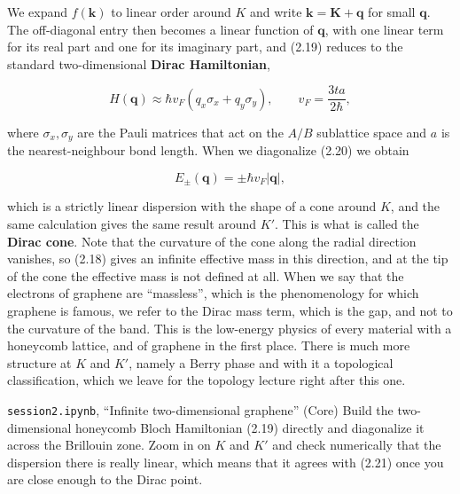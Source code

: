 We expand $f(\mathbf{k})$ to linear order around $K$ and write $\mathbf{k}=\mathbf{K}+\mathbf{q}$ for
small $\mathbf{q}$. The off-diagonal entry then becomes a linear function of $\mathbf{q}$, with one
linear term for its real part and one for its imaginary part, and (2.19) reduces to the standard
two-dimensional \textbf{Dirac Hamiltonian},

\begin{equation}H(\mathbf{q}) \approx \hbar v_F\left(q_x\sigma_x + q_y\sigma_y\right), \qquad
v_F = \frac{3ta}{2\hbar},\end{equation}

where $\sigma_x,\sigma_y$ are the Pauli matrices that act on the $A/B$ sublattice space and $a$ is
the nearest-neighbour bond length. When we diagonalize (2.20) we obtain

\begin{equation}E_\pm(\mathbf{q}) = \pm \hbar v_F |\mathbf{q}|,\end{equation}

which is a strictly linear dispersion with the shape of a cone around $K$, and the same calculation
gives the same result around $K'$. This is what is called the \textbf{Dirac cone}. Note that the
curvature of the cone along the radial direction vanishes, so (2.18) gives an infinite effective
mass in this direction, and at the tip of the cone the effective mass is not defined at all. When
we say that the electrons of graphene are ``massless'', which is the phenomenology for which graphene
is famous, we refer to the Dirac mass term, which is the gap, and not to the curvature of the band. This is the low-energy physics of every material with a honeycomb lattice, and of
graphene in the first place. There is much more structure at $K$ and $K'$, namely a Berry phase and
with it a topological classification, which we leave for the topology lecture right after this one.

\begin{notebookbox}{\texttt{session2.ipynb}, ``Infinite two-dimensional graphene'' (Core)}
Build the two-dimensional honeycomb Bloch Hamiltonian (2.19) directly and diagonalize it across the
Brillouin zone. Zoom in on $K$ and $K'$ and check numerically that the dispersion there is really
linear, which means that it agrees with (2.21) once you are close enough to the Dirac point.
\end{notebookbox}


